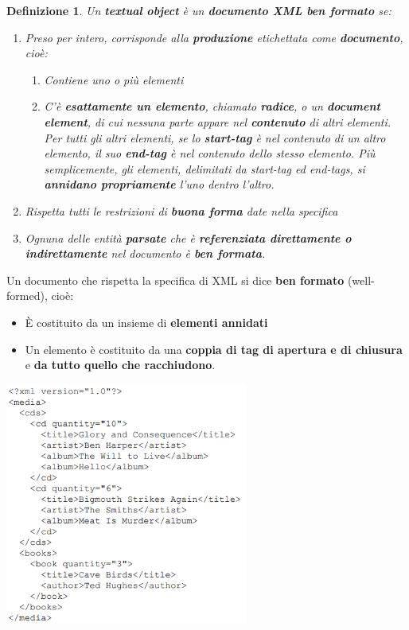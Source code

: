 \documentclass[12pt]{article}
\newtheorem{Definizione}{Definizione}[subsection]
\begin{document}
\begin{Definizione}
    Un \textbf{textual object} è un \textbf{documento XML ben formato} se:
    \begin{enumerate}
        \item Preso per intero, corrisponde alla \textbf{produzione} etichettata come \textbf{documento}, cioè:
        \begin{enumerate}
            \item Contiene uno o più elementi
            \item C'è \textbf{esattamente un elemento}, chiamato \textbf{radice}, o un \textbf{document element}, di cui nessuna parte appare nel \textbf{contenuto} di altri elementi.
            Per tutti gli altri elementi, se lo \textbf{start-tag} è nel contenuto di un altro elemento, il suo \textbf{end-tag} è nel contenuto dello stesso elemento. Più semplicemente, gli elementi, 
            delimitati da start-tag ed end-tags, si \textbf{annidano propriamente} l'uno dentro l'altro.
        \end{enumerate}
        \item Rispetta tutti le restrizioni di \textbf{buona forma} date nella specifica
        \item Ognuna delle entità \textbf{parsate} che è \textbf{referenziata direttamente o indirettamente} nel documento è \textbf{ben formata}.
    \end{enumerate}
\end{Definizione}
Un documento che rispetta la specifica di XML si dice \textbf{ben formato} (well-formed), cioè:
\begin{itemize}
    \item È costituito da un insieme di \textbf{elementi annidati}
    \item Un elemento è costituito da una \textbf{coppia di tag di apertura e di chiusura} e \textbf{da tutto quello che racchiudono}.
\end{itemize}
\begin{center}
    \includegraphics[width = 0.60\textwidth]{Images/147.PNG}
\end{center}
\end{document}
